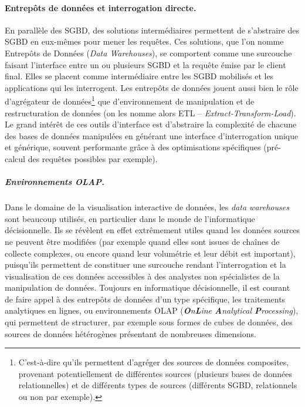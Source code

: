 \paragraph{Entrepôts de données et interrogation directe.}\label{par:interrogation-directe}

En parallèle des SGBD, des solutions \og intermédiaires\fg{} permettent de s'abstraire des SGBD en eux-mêmes pour mener les requêtes.
Ces solutions, que l'on nomme \og Entrepôts de Données\fg{} (\textit{Data Warehouses}), se comportent comme une surcouche faisant l'interface entre un ou plusieurs SGBD et la requête émise par le client final.
Elles se placent comme intermédiaire entre les SGBD mobilisés et les applications qui les interrogent.
Les entrepôts de données jouent aussi bien le rôle d'agrégateur de données\footnote{
	C'est-à-dire qu'ils permettent d'agréger des sources de données composites, provenant potentiellement de différentes sources (plusieurs bases de données relationnelles) et de différents types de sources (différents SGBD, relationnels ou non par exemple).
} que d'environnement de manipulation et de restructuration de données (on les nomme alors \og ETL\fg{} -- \textit{Extract-Transform-Load}).
Le grand intérêt de ces outils d'interface est d'abstraire la complexité de chacune des bases de données manipulées en générant une interface d'interrogation unique et générique, souvent performante grâce à des optimisations spécifiques (pré-calcul des requêtes possibles par exemple).

\subparagraph{Environnements OLAP.}
Dans le domaine de la visualisation interactive de données, les \textit{data warehouses} sont beaucoup utilisés, en particulier dans le monde de l'informatique décisionnelle.
Ils se révèlent en effet extrêmement utiles quand les données sources ne peuvent être modifiées (par exemple quand elles sont issues de chaînes de collecte complexes, ou encore quand leur volumétrie et leur débit est important), puisqu'ils permettent de constituer une surcouche rendant l'interrogation et la visualisation de ces données accessibles à des analystes non spécialistes de la manipulation de données.
Toujours en informatique décisionnelle, il est courant de faire appel à des entrepôts de données d'un type spécifique, les \og traitements analytiques en lignes\fg{}, ou environnements OLAP (\textit{\textbf{O}n\textbf{L}ine \textbf{A}nalytical \textbf{P}rocessing}), qui permettent de structurer, par exemple sous formes de cubes de données, des sources de données hétérogènes présentant de nombreuses dimensions.

